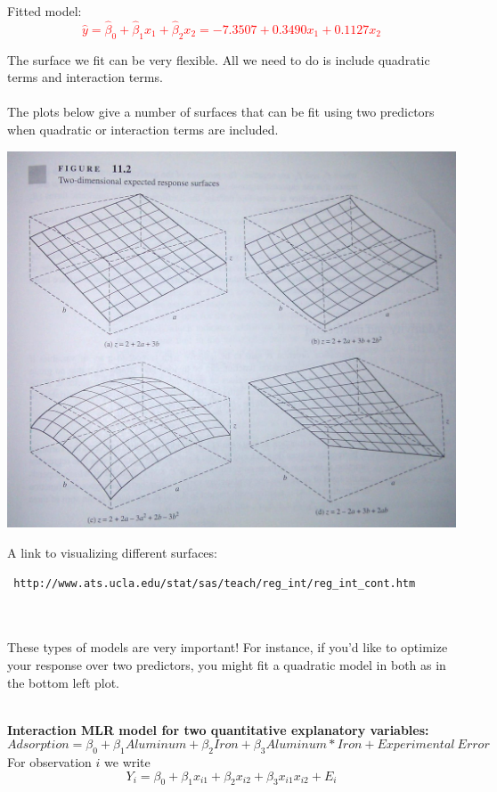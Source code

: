 Fitted model:
\textcolor{red}{$$\hat{y}= \hat\beta_0 + \hat\beta_1 x_{1} + \hat\beta_2 x_{2} = -7.3507+0.3490x_1+0.1127x_2$$}
\newpage

The surface we fit can be very flexible.  All we need to do is include quadratic terms and interaction terms.\\~\\
The plots below give a number of surfaces that can be fit using two predictors when quadratic or interaction terms are included.
\begin{center}
\includegraphics[scale=0.3]{surfaces}
\end{center}

A link to visualizing different surfaces:  \begin{verbatim} http://www.ats.ucla.edu/stat/sas/teach/reg_int/reg_int_cont.htm \end{verbatim}~\\~\\

These types of models are very important!  For instance, if you'd like to optimize your response over two predictors, you might fit a quadratic model in both as in the bottom left plot.\\~\\


\newpage

\Large\textbf{Interaction MLR model for two quantitative explanatory variables:}\large\\
$$Adsorption = \beta_0+\beta_1Aluminum+\beta_2Iron+\beta_3Aluminum*Iron+Experimental~Error$$
For observation $i$ we write 
$$Y_i = \beta_0 + \beta_1 x_{i1} + \beta_2 x_{i2} + \beta_3x_{i1}x_{i2}+E_{i}$$


